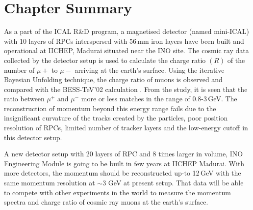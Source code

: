 \section{Chapter Summary}
As a part of the ICAL R\&D program, a magnetised detector
(named mini-ICAL) with 10 layers of RPCs interspersed with 56\,mm iron
layers have been built and operational at IICHEP, Madurai situated
near the INO site. The cosmic ray data collected by the detector
setup is used to calculate the charge ratio $(R)$ of the number
of $\mu+$ to $\mu-$ arriving at the earth's surface.
Using the iterative Bayesian Unfolding technique, the charge ratio
of muons is observed and compared with the BESS-TeV'02 calculation
\cite{bess2002}.
From the study, it is seen that the ratio between $\mu^{+}$ and
$\mu^{-}$ more or less matches in the range of 0.8-3\,GeV.
The reconstruction of momentum beyond this energy range fails due to the
insignificant curvature of the tracks created by the particles, poor
position resolution of RPCs, limited number of tracker layers and
the low-energy cutoff in this detector setup.

A new detector setup with 20 layers of RPC and 8 times larger in volume,
INO Engineering Module is going to be built in few years at IICHEP
Madurai. With more detectors, the momentum should be
reconstructed up-to 12\,GeV with the same momentum resolution at
$\sim$3 GeV at present setup. That data will be able to compete
with other experiments in the world to measure the momentum spectra
and charge ratio of cosmic ray muons at the earth's surface.
